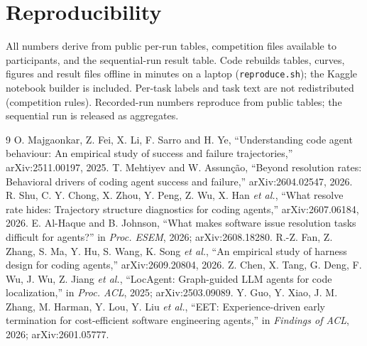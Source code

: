 \documentclass[conference]{IEEEtran}
\begin{document}
\section{Reproducibility}
All numbers derive from public per-run tables, competition files available to participants, and the sequential-run result table. Code rebuilds tables, curves, figures and result files offline in minutes on a laptop (\texttt{reproduce.sh}); the Kaggle notebook builder is included. Per-task labels and task text are not redistributed (competition rules). Recorded-run numbers reproduce from public tables; the sequential run is released as aggregates.

\begin{thebibliography}{9}
 O. Majgaonkar, Z. Fei, X. Li, F. Sarro and H. Ye, ``Understanding code agent behaviour: An empirical study of success and failure trajectories,'' arXiv:2511.00197, 2025.
 T. Mehtiyev and W. Assun\c{c}\~ao, ``Beyond resolution rates: Behavioral drivers of coding agent success and failure,'' arXiv:2604.02547, 2026.
 R. Shu, C. Y. Chong, X. Zhou, Y. Peng, Z. Wu, X. Han \emph{et al.}, ``What resolve rate hides: Trajectory structure diagnostics for coding agents,'' arXiv:2607.06184, 2026.
 E. Al-Haque and B. Johnson, ``What makes software issue resolution tasks difficult for agents?'' in \emph{Proc. ESEM}, 2026; arXiv:2608.18280.
 R.-Z. Fan, Z. Zhang, S. Ma, Y. Hu, S. Wang, K. Song \emph{et al.}, ``An empirical study of harness design for coding agents,'' arXiv:2609.20804, 2026.
 Z. Chen, X. Tang, G. Deng, F. Wu, J. Wu, Z. Jiang \emph{et al.}, ``LocAgent: Graph-guided LLM agents for code localization,'' in \emph{Proc. ACL}, 2025; arXiv:2503.09089.
 Y. Guo, Y. Xiao, J. M. Zhang, M. Harman, Y. Lou, Y. Liu \emph{et al.}, ``EET: Experience-driven early termination for cost-efficient software engineering agents,'' in \emph{Findings of ACL}, 2026; arXiv:2601.05777.
\end{thebibliography}
\end{document}

